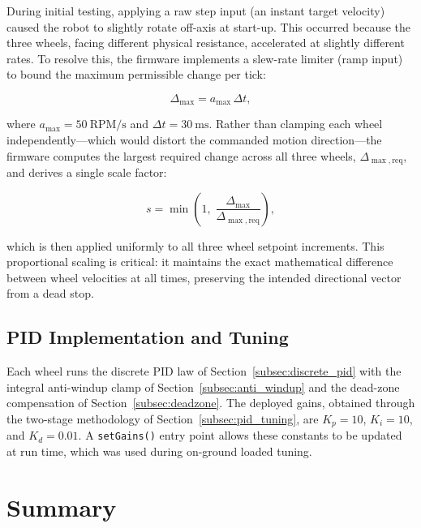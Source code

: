 During initial testing, applying a raw step input (an instant target velocity) caused the robot to slightly rotate off-axis at start-up. This occurred because the three wheels, facing different physical resistance, accelerated at slightly different rates. To resolve this, the firmware implements a slew-rate limiter (ramp input) to bound the maximum permissible change per tick:

\begin{equation}
\Delta_{\max} = a_{\max} \, \Delta t,
\label{eq:ramp_max_change}
\end{equation}

where $a_{\max} = 50~\mathrm{RPM/s}$ and $\Delta t = 30~\mathrm{ms}$. Rather than clamping each wheel independently---which would distort the commanded motion direction---the firmware computes the largest required change across all three wheels, $\Delta_{\max,\text{req}}$, and derives a single scale factor:

\begin{equation}
s = \min\!\left(1,\; \frac{\Delta_{\max}}{\Delta_{\max,\text{req}}}\right),
\label{eq:ramp_scale}
\end{equation}

which is then applied uniformly to all three wheel setpoint increments. This proportional scaling is critical: it maintains the exact mathematical difference between wheel velocities at all times, preserving the intended directional vector from a dead stop.


\subsection{PID Implementation and Tuning}
\label{subsec:pid_impl}

Each wheel runs the discrete PID law of Section~\ref{subsec:discrete_pid} with the integral anti-windup clamp of Section~\ref{subsec:anti_windup} and the dead-zone compensation of Section~\ref{subsec:deadzone}. The deployed gains, obtained through the two-stage methodology of Section~\ref{subsec:pid_tuning}, are $K_p = 10$, $K_i = 10$, and $K_d = 0.01$. A \texttt{setGains()} entry point allows these constants to be updated at run time, which was used during on-ground loaded tuning.



\section{Summary}
\label{sec:electrical_summary}

